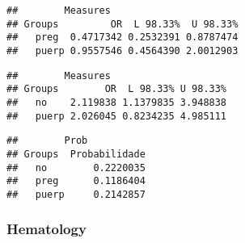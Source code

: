 \documentclass[
]{article}
\newenvironment{Shaded}{\begin{snugshade}}{\end{snugshade}}
\newcommand{\CommentTok}[1]{\textcolor[rgb]{0.56,0.35,0.01}{\textit{#1}}}
\newcommand{\KeywordTok}[1]{\textcolor[rgb]{0.13,0.29,0.53}{\textbf{#1}}}
\newcommand{\NormalTok}[1]{#1}
\newcommand{\OperatorTok}[1]{\textcolor[rgb]{0.81,0.36,0.00}{\textbf{#1}}}
\newcommand{\StringTok}[1]{\textcolor[rgb]{0.31,0.60,0.02}{#1}}
\begin{document}
\begin{verbatim}
##        Measures
## Groups         OR  L 98.33%  U 98.33%
##   preg  0.4717342 0.2532391 0.8787474
##   puerp 0.9557546 0.4564390 2.0012903
\end{verbatim}

\begin{Shaded}
\end{Shaded}

\begin{verbatim}
##        Measures
## Groups        OR  L 98.33% U 98.33%
##   no    2.119838 1.1379835 3.948838
##   puerp 2.026045 0.8234235 4.985111
\end{verbatim}

\begin{Shaded}
\end{Shaded}

\begin{verbatim}
##        Prob
## Groups  Probabilidade
##   no        0.2220035
##   preg      0.1186404
##   puerp     0.2142857
\end{verbatim}

\hypertarget{hematology-1}{%
\subsubsection{Hematology}\label{hematology-1}}

\begin{Shaded}
\end{Shaded}
\end{document}
